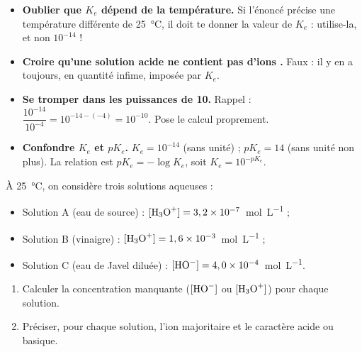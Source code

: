 \documentclass[11pt]{article}
\begin{document}
\begin{attention}
\begin{itemize}
\item \textbf{Oublier que $K_e$ dépend de la température.} Si l'énoncé précise une température différente de \SI{25}{\celsius}, il doit te donner la valeur de $K_e$ : utilise-la, et non $10^{-14}$ !
\item \textbf{Croire qu'une solution acide ne contient pas d'ions .} Faux : il y en a toujours, en quantité infime, imposée par $K_e$.
\item \textbf{Se tromper dans les puissances de 10.} Rappel : $\dfrac{10^{-14}}{10^{-4}} = 10^{-14-(-4)} = 10^{-10}$. Pose le calcul proprement.
\item \textbf{Confondre $K_e$ et $pK_e$.} $K_e = 10^{-14}$ (sans unité) ; $pK_e = 14$ (sans unité non plus). La relation est $pK_e = -\log K_e$, soit $K_e = 10^{-pK_e}$.
\end{itemize}
\end{attention}

\begin{exercice}
À \SI{25}{\celsius}, on considère trois solutions aqueuses :
\begin{itemize}
\item Solution A (eau de source) : $[\ce{H3O+}] = 3,2 \times 10^{-7}$~\si{mol.L^{-1}} ;
\item Solution B (vinaigre) : $[\ce{H3O+}] = 1,6 \times 10^{-3}$~\si{mol.L^{-1}} ;
\item Solution C (eau de Javel diluée) : $[\ce{HO-}] = 4,0 \times 10^{-4}$~\si{mol.L^{-1}}.
\end{itemize}
\begin{enumerate}
\item Calculer la concentration manquante ($[\ce{HO-}]$ ou $[\ce{H3O+}]$) pour chaque solution.
\item Préciser, pour chaque solution, l'ion majoritaire et le caractère acide ou basique.
\end{enumerate}
\end{exercice}
\end{document}
